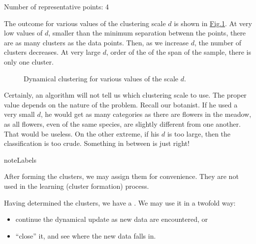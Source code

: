 \documentclass[letterpaper,10pt,english]{jupyterBook}
\let\sphinxpxdimen\pdfpxdimen\else\newdimen\sphinxpxdimen
\begin{document}
\begin{sphinxVerbatim}[commandchars=\\\{\}]
Number of representative points:  4
\end{sphinxVerbatim}

\sphinxAtStartPar
The outcome for various values of the clustering scale \(d\) is shown in \hyperref[\detokenize{docs/unsupervised:dyn-fig}]{Fig.\@ \ref{\detokenize{docs/unsupervised:dyn-fig}}}. At very low values of \(d\), smaller than the minimum separation betwenn the points, there are as many clusters as the data points. Then, as we increase \(d\), the number of clusters decreases. At very large \(d\), order of the of the span of the sample, there is only one cluster.

\begin{figure}[htbp]
\centering
\capstart

\noindent\sphinxincludegraphics[width=770\sphinxpxdimen]{{cd}.jpg}
\caption{Dynamical clustering for various values of the scale \(d\).}\label{\detokenize{docs/unsupervised:dyn-fig}}\end{figure}

\sphinxAtStartPar
Certainly, an algorithm will not tell us which clustering scale to use. The proper value depends on the nature of the problem. Recall our botanist. If he used a very small \(d\), he would get as many categories as there are flowers in the meadow, as all flowers, even of the same species, are slightly different from one another. That would be useless. On the other extreme, if his \(d\) is too large, then the classification is too crude. Something in between is just right!

\begin{sphinxadmonition}{note}{Labels}

\sphinxAtStartPar
After forming the clusters, we may assign them  for convenience. They are not used in the learning (cluster formation) process.
\end{sphinxadmonition}

\sphinxAtStartPar
Having determined the clusters, we have a . We may use it in a two\sphinxhyphen{}fold way:
\begin{itemize}
\item {} 
\sphinxAtStartPar
continue the dynamical update as new data are encountered, or

\item {} 
\sphinxAtStartPar
“close” it, and see where the new data falls in.

\end{itemize}
\end{document}
